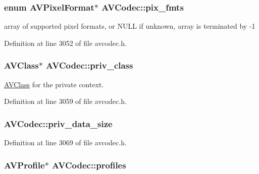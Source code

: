 \subsubsection[{\texorpdfstring{pix\+\_\+fmts}{pix_fmts}}]{\setlength{\rightskip}{0pt plus 5cm}enum {\bf A\+V\+Pixel\+Format}$\ast$ A\+V\+Codec\+::pix\+\_\+fmts}\hypertarget{struct_a_v_codec_ac2b97bd3c19686025e1b7d577329c250}{}\label{struct_a_v_codec_ac2b97bd3c19686025e1b7d577329c250}


array of supported pixel formats, or N\+U\+LL if unknown, array is terminated by -\/1 



Definition at line 3052 of file avcodec.\+h.

\subsubsection[{\texorpdfstring{priv\+\_\+class}{priv_class}}]{ {\bf A\+V\+Class}$\ast$ A\+V\+Codec\+::priv\+\_\+class}\hypertarget{struct_a_v_codec_a4ded9f7ec1fa1a73ea3e831428c100fa}{}\label{struct_a_v_codec_a4ded9f7ec1fa1a73ea3e831428c100fa}


\hyperlink{struct_a_v_class}{A\+V\+Class} for the private context. 



Definition at line 3059 of file avcodec.\+h.

\subsubsection[{\texorpdfstring{priv\+\_\+data\+\_\+size}{priv_data_size}}]{ A\+V\+Codec\+::priv\+\_\+data\+\_\+size}\hypertarget{struct_a_v_codec_aa86c803fcfc0ebb569b15d4645d0e796}{}\label{struct_a_v_codec_aa86c803fcfc0ebb569b15d4645d0e796}


Definition at line 3069 of file avcodec.\+h.

\subsubsection[{\texorpdfstring{profiles}{profiles}}]{ {\bf A\+V\+Profile}$\ast$ A\+V\+Codec\+::profiles}\hypertarget{struct_a_v_codec_ac832350f2bac582fe3d174e2e3b1eb5e}{}\label{struct_a_v_codec_ac832350f2bac582fe3d174e2e3b1eb5e}


